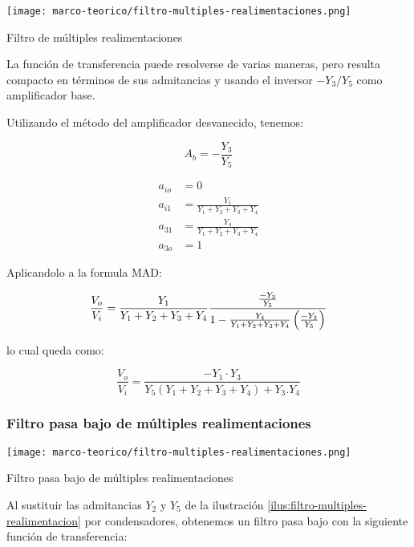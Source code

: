 \begin{ilustracion}[ht]
    \centering
    \texttt{[image: marco-teorico/filtro-multiples-realimentaciones.png]}
    \caption{Filtro de múltiples realimentaciones}
    \label{ilus:filtro-multiples-realimentacion}
\end{ilustracion}

La función de transferencia puede resolverse de varias maneras, pero resulta compacto en términos de sus admitancias y usando el inversor $-Y_3/Y_5$ como amplificador base.

Utilizando el método del amplificador desvanecido, tenemos:

$$A_b = - \frac{Y_3}{Y_5}$$

\begin{align*}
    a_{io} &= 0 \\
    a_{i1} &= \frac{Y_1}{Y_1 + Y_2 + Y_3 + Y_4}\\
    a_{31} &= \frac{Y_4}{Y_1 + Y_2 + Y_3 + Y_4}\\
    a_{3o} &= 1
\end{align*}

Aplicandolo a la formula MAD:

\begin{equation}
    \frac{V_o}{V_i} = \frac{Y_1}{Y_1 + Y_2 + Y_3 + Y_4} \frac{\frac{-Y_3}{Y_5}}{1 - \frac{Y_4}{Y_1 + Y_2 + Y_3 + Y_4} \left( \frac{-Y_3}{Y_5} \right)}
\end{equation}

lo cual queda como:

\begin{equation}
    \frac{V_o}{V_i} = \frac{-Y_1 \cdot Y_3}{Y_5(Y_1 + Y_2 + Y_3 + Y_4)+ Y_3.Y_4} 
    \label{eq:filtro-multirealimentacion}
\end{equation}

\subsubsection{Filtro pasa bajo de múltiples realimentaciones}

\begin{ilustracion}[ht]
    \centering
    \texttt{[image: marco-teorico/filtro-multiples-realimentaciones.png]}
    \caption{Filtro pasa bajo de múltiples realimentaciones}
    \label{ilus:filtro-multiples-realimentacion-pasa-bajo}
\end{ilustracion}

Al sustituir las admitancias $Y_2$ y $Y_5$ de la ilustración \ref{ilus:filtro-multiples-realimentacion} por condensadores, obtenemos un filtro pasa bajo con la siguiente función de transferencia:

